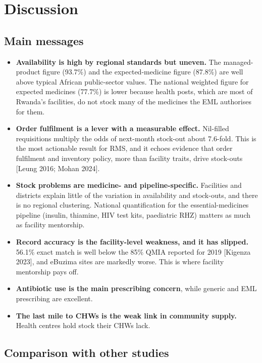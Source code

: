 \documentclass[10pt,a4paper]{report}
\begin{document}
\chapter{Discussion}
\section{Main messages}
\begin{itemize}\item \textbf{Availability is high by regional standards but uneven.} The managed-product figure (93.7\%) and the expected-medicine figure (87.8\%) are well above typical African public-sector values. The national weighted figure for expected medicines (77.7\%) is lower because health posts, which are most of Rwanda's facilities, do not stock many of the medicines the EML authorises for them.
\item \textbf{Order fulfilment is a lever with a measurable effect.} Nil-filled requisitions multiply the odds of next-month stock-out about 7.6-fold. This is the most actionable result for RMS, and it echoes evidence that order fulfilment and inventory policy, more than facility traits, drive stock-outs [Leung 2016; Mohan 2024].
\item \textbf{Stock problems are medicine- and pipeline-specific.} Facilities and districts explain little of the variation in availability and stock-outs, and there is no regional clustering. National quantification for the essential-medicines pipeline (insulin, thiamine, HIV test kits, paediatric RHZ) matters as much as facility mentorship.
\item \textbf{Record accuracy is the facility-level weakness, and it has slipped.} 56.1\% exact match is well below the 85\% QMIA reported for 2019 [Kigenza 2023], and eBuzima sites are markedly worse. This is where facility mentorship pays off.
\item \textbf{Antibiotic use is the main prescribing concern}, while generic and EML prescribing are excellent.
\item \textbf{The last mile to CHWs is the weak link in community supply.} Health centres hold stock their CHWs lack.
\end{itemize}
\section{Comparison with other studies}
\end{document}
